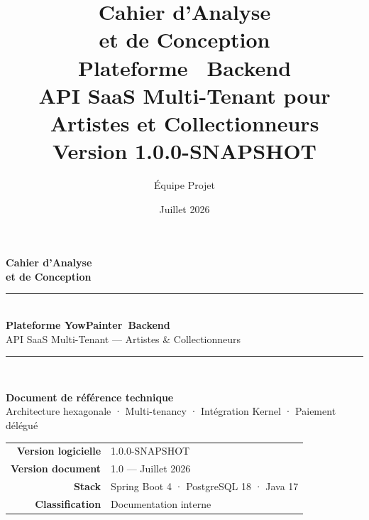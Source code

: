 \documentclass[11pt,a4paper,twoside,openright]{report}
\title{%
  {\Huge\textbf{Cahier d'Analyse\\et de Conception}}\\[1.5em]
  {\LARGE Plateforme \yow\ Backend}\\[0.8em]
  {\large API SaaS Multi-Tenant pour Artistes et Collectionneurs}\\[2em]
  {\large Version 1.0.0-SNAPSHOT}
}
\author{Équipe Projet \yow}
\date{Juillet 2026}
\newcommand{\yow}{YowPainter}
\begin{document}
\begin{titlepage}
  \centering
  \vspace*{2cm}
  {\Huge\textbf{Cahier d'Analyse\\[0.3em] et de Conception}}\\[2em]
  \rule{\textwidth}{1.5pt}\\[1em]
  {\LARGE\textbf{Plateforme \yow\ Backend}}\\[0.5em]
  {\large API SaaS Multi-Tenant — Artistes \& Collectionneurs}\\[1em]
  \rule{\textwidth}{0.5pt}\\[3em]

  \begin{tcolorbox}[colback=domaincolor, colframe=yowblue, width=0.85\textwidth, arc=4pt]
    \centering
    \textbf{Document de référence technique}\\[0.5em]
    Architecture hexagonale · Multi-tenancy · Intégration Kernel · Paiement délégué
  \end{tcolorbox}

  \vfill
  \begin{tabular}{rl}
    \textbf{Version logicielle} & 1.0.0-SNAPSHOT \\
    \textbf{Version document}  & 1.0 — Juillet 2026 \\
    \textbf{Stack}             & Spring Boot 4 · PostgreSQL 18 · Java 17 \\
    \textbf{Classification}    & Documentation interne \\
  \end{tabular}
  \vspace{2cm}
\end{titlepage}

\tableofcontents
\listoffigures
\listoftables
\cleardoublepage
{}












\end{document}
